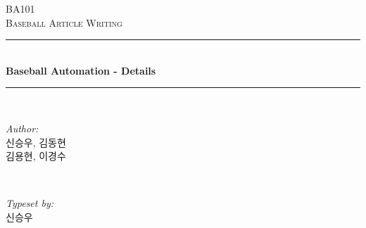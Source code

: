 \documentclass[twoside]{article}
\begin{document}
\begin{titlepage}

\newcommand{\HRule}{\rule{\linewidth}{0.5mm}} %

\center %
 

\vspace*{3cm}
\textsc{\Large BA101}\\[0.5cm] %
\textsc{\large Baseball Article Writing}\\[0.5cm] %


\HRule \\[0.4cm]
{ \huge \bfseries Baseball Automation - Details}\\[0.4cm] %
\HRule \\[1.5cm]
 

\begin{minipage}{0.4\textwidth}
\begin{flushleft} \large
\emph{Author:}\\
신승우, 김동현 \\ 
김용현, 이경수 
\end{flushleft}
\end{minipage}
~
\begin{minipage}{0.4\textwidth}
\begin{flushright} \large
\emph{Typeset by:} \\
신승우
\end{flushright}
\end{minipage}\\[4cm]



\end{titlepage}
\end{document}
